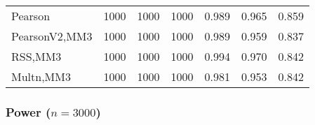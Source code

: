 \documentclass[
]{article}
\begin{document}
\begin{table}[H]
{\begin{tabular}[t]{lrrrrrr}
\hspace{1em}Pearson & 1000 & 1000 & 1000 & 0.989 & 0.965 & 0.859\\
\hspace{1em}PearsonV2,MM3 & 1000 & 1000 & 1000 & 0.989 & 0.959 & 0.837\\
\hspace{1em}RSS,MM3 & 1000 & 1000 & 1000 & 0.994 & 0.970 & 0.842\\
\hspace{1em}Multn,MM3 & 1000 & 1000 & 1000 & 0.981 & 0.953 & 0.842\\
\bottomrule
\end{tabular}}
\end{table}

\hypertarget{power-n3000-3}{%
\subsubsection{\texorpdfstring{Power
(\(n=3000\))}{Power (n=3000)}}\label{power-n3000-3}}
\end{document}
